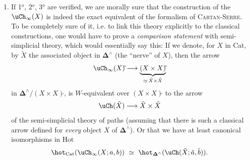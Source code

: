 \begin{enumerate}[label={}, leftmargin=*]
\item[5$^o$)] If 1$^o$, 2$^o$, 3$^o$ are verified, we are morally sure that the construction of the $\uCh_\infty(X)$ is indeed the exact equivalent of the formalism of \textsc{Cartan-Serre}. To be completely sure of it, i.e. to link this theory explicitly to the classical constructions, one would have to prove a \textit{comparison statement} with semi-simplicial theory, which would essentially say this: If we denote, for $X$ in Cat, by $\tilde{X}$ the associated object in $\mathbf{\Delta}^\wedge$ (the ``nerve'' of $X$), then the arrow
\[
\uCh_\infty(X)\tilde{}\longrightarrow\underbrace{(X\times X)\tilde{}}_{\simeq\,\tilde{X}\times\tilde{X}}
\]
in $\mathbf{\Delta}^\wedge/(X\times X)\tilde{}$, is $W$-equivalent over $(X\times X)\tilde{}$ to the arrow
\[
\uCh(\tilde{X})\longrightarrow\tilde{X}\times\tilde{X}
\]
of the semi-simplicial theory of paths (assuming that there is such a classical arrow defined for \textit{every} object $X$ of $\mathbf{\Delta}^\wedge$). Or that we have at least canonical isomorphisms in Hot
\[
\hot_{\mathrm{Cat}}(\uCh_\infty(X;a,b))\ \simeq\ \hot_{\mathbf{\Delta}^\wedge}(\uCh(\tilde{X};\tilde{a},\tilde{b})).
\]
\end{enumerate}